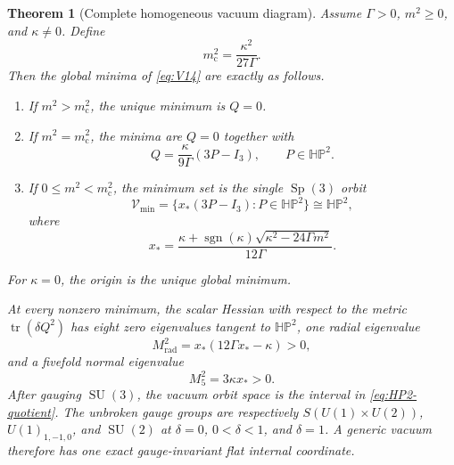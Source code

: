 \documentclass[11pt]{article}
\newtheorem{theorem}{Theorem}[section]
\theoremstyle{definition}
\theoremstyle{remark}
\newcommand{\HP}{\mathbb{HP}}
\newcommand{\tr}{\operatorname{tr}}
\newcommand{\Sp}{\operatorname{Sp}}
\newcommand{\SU}{\operatorname{SU}}
\begin{document}
\begin{theorem}[Complete homogeneous vacuum diagram]\label{thm:vacuum-diagram}
Assume $\Gamma>0$, $m^2\geq0$, and $\kappa\neq0$.  Define
\begin{equation}\label{eq:critical-mass}
 m_{\mathrm c}^2=\frac{\kappa^2}{27\Gamma}.
\end{equation}
Then the global minima of \eqref{eq:V14} are exactly as follows.
\begin{enumerate}
\item If $m^2>m_{\mathrm c}^2$, the unique minimum is $Q=0$.
\item If $m^2=m_{\mathrm c}^2$, the minima are $Q=0$ together with
\begin{equation}\label{eq:coexistence-vacua}
 Q=\frac{\kappa}{9\Gamma}(3P-I_3),
 \qquad P\in\HP^2.
\end{equation}
\item If $0\leq m^2<m_{\mathrm c}^2$, the minimum set is the single
$\Sp(3)$ orbit
\begin{equation}\label{eq:broken-vacua}
 \boxed{
 \mathcal V_{\min}
 =\{x_*(3P-I_3):P\in\HP^2\}
 \cong\HP^2,}
\end{equation}
where
\begin{equation}\label{eq:x-star}
 x_*
 =\frac{\kappa+\operatorname{sgn}(\kappa)
 \sqrt{\kappa^2-24\Gamma m^2}}{12\Gamma}.
\end{equation}
\end{enumerate}
For $\kappa=0$, the origin is the unique global minimum.

At every nonzero minimum, the scalar Hessian with respect to the metric
$\tr(\delta Q^2)$ has eight zero eigenvalues tangent to $\HP^2$, one
radial eigenvalue
\begin{equation}\label{eq:radial-mass}
 M_{\mathrm{rad}}^2=x_*(12\Gamma x_*-\kappa)>0,
\end{equation}
and a fivefold normal eigenvalue
\begin{equation}\label{eq:five-mass}
 M_5^2=3\kappa x_*>0.
\end{equation}
After gauging $\SU(3)$, the vacuum orbit space is the interval in
\eqref{eq:HP2-quotient}.  The unbroken gauge groups are respectively
$S(U(1)\times U(2))$, $U(1)_{1,-1,0}$, and $\SU(2)$ at
$\delta=0$, $0<\delta<1$, and $\delta=1$.  A generic vacuum therefore has one
exact gauge-invariant flat internal coordinate.
\end{theorem}
\end{document}

